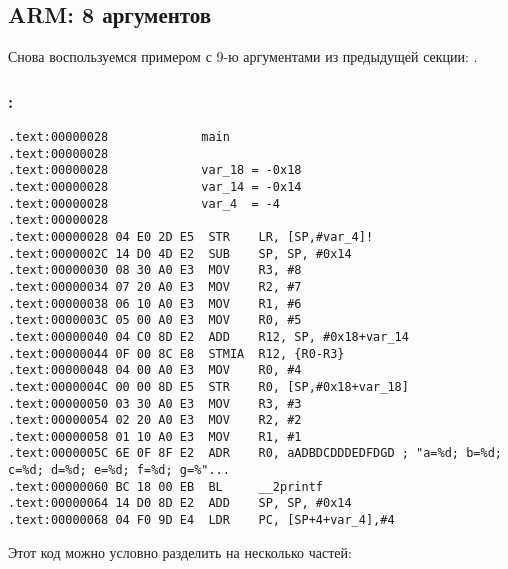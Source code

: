 \subsection{ARM: 8 аргументов}

Снова воспользуемся примером с 9-ю аргументами из предыдущей секции: .



\subsubsection{\OptimizingKeilVI: \ARMMode}

\begin{lstlisting}
.text:00000028             main
.text:00000028
.text:00000028             var_18 = -0x18
.text:00000028             var_14 = -0x14
.text:00000028             var_4  = -4
.text:00000028
.text:00000028 04 E0 2D E5  STR    LR, [SP,#var_4]!
.text:0000002C 14 D0 4D E2  SUB    SP, SP, #0x14
.text:00000030 08 30 A0 E3  MOV    R3, #8
.text:00000034 07 20 A0 E3  MOV    R2, #7
.text:00000038 06 10 A0 E3  MOV    R1, #6
.text:0000003C 05 00 A0 E3  MOV    R0, #5
.text:00000040 04 C0 8D E2  ADD    R12, SP, #0x18+var_14
.text:00000044 0F 00 8C E8  STMIA  R12, {R0-R3}
.text:00000048 04 00 A0 E3  MOV    R0, #4
.text:0000004C 00 00 8D E5  STR    R0, [SP,#0x18+var_18]
.text:00000050 03 30 A0 E3  MOV    R3, #3
.text:00000054 02 20 A0 E3  MOV    R2, #2
.text:00000058 01 10 A0 E3  MOV    R1, #1
.text:0000005C 6E 0F 8F E2  ADR    R0, aADBDCDDDEDFDGD ; "a=%d; b=%d; c=%d; d=%d; e=%d; f=%d; g=%"...
.text:00000060 BC 18 00 EB  BL     __2printf
.text:00000064 14 D0 8D E2  ADD    SP, SP, #0x14
.text:00000068 04 F0 9D E4  LDR    PC, [SP+4+var_4],#4
\end{lstlisting}

Этот код можно условно разделить на несколько частей:

